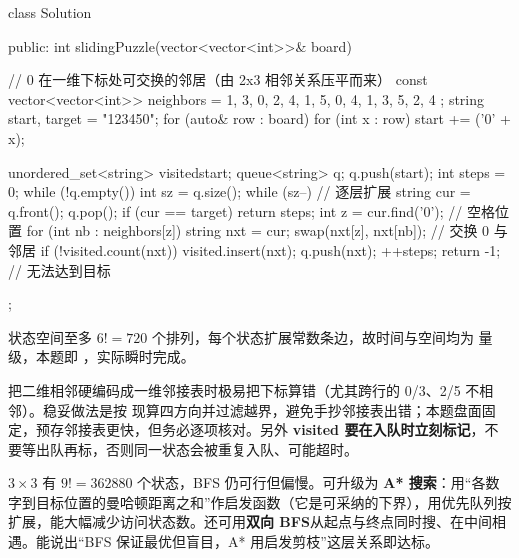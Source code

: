 \begin{cpp}
class Solution {
public:
    int slidingPuzzle(vector<vector<int>>& board) {
        // 0 在一维下标处可交换的邻居（由 2x3 相邻关系压平而来）
        const vector<vector<int>> neighbors = {
            {1, 3}, {0, 2, 4}, {1, 5}, {0, 4}, {1, 3, 5}, {2, 4}
        };
        string start, target = "123450";
        for (auto& row : board)
            for (int x : row) start += ('0' + x);

        unordered_set<string> visited{start};
        queue<string> q;
        q.push(start);
        int steps = 0;
        while (!q.empty()) {
            int sz = q.size();
            while (sz--) {                      // 逐层扩展
                string cur = q.front(); q.pop();
                if (cur == target) return steps;
                int z = cur.find('0');          // 空格位置
                for (int nb : neighbors[z]) {
                    string nxt = cur;
                    swap(nxt[z], nxt[nb]);      // 交换 0 与邻居
                    if (!visited.count(nxt)) {
                        visited.insert(nxt);
                        q.push(nxt);
                    }
                }
            }
            ++steps;
        }
        return -1;                              // 无法达到目标
    }
};
\end{cpp}

\begin{keypoint}[复杂度]
状态空间至多 $6!=720$ 个排列，每个状态扩展常数条边，故时间与空间均为  量级，本题即 ，实际瞬时完成。
\end{keypoint}

\begin{pitfall}[一维邻接表别写错]
把二维相邻硬编码成一维邻接表时极易把下标算错（尤其跨行的 0/3、2/5 不相邻）。稳妥做法是按  现算四方向并过滤越界，避免手抄邻接表出错；本题盘面固定，预存邻接表更快，但务必逐项核对。另外 \textbf{visited 要在入队时立刻标记}，不要等出队再标，否则同一状态会被重复入队、可能超时。
\end{pitfall}

\begin{followup}
$3\times 3$ 有 $9!=362880$ 个状态，BFS 仍可行但偏慢。可升级为 \textbf{A* 搜索}：用“各数字到目标位置的曼哈顿距离之和”作启发函数（它是可采纳的下界），用优先队列按  扩展，能大幅减少访问状态数。还可用\textbf{双向 BFS}从起点与终点同时搜、在中间相遇。能说出“BFS 保证最优但盲目，A* 用启发剪枝”这层关系即达标。
\end{followup}

